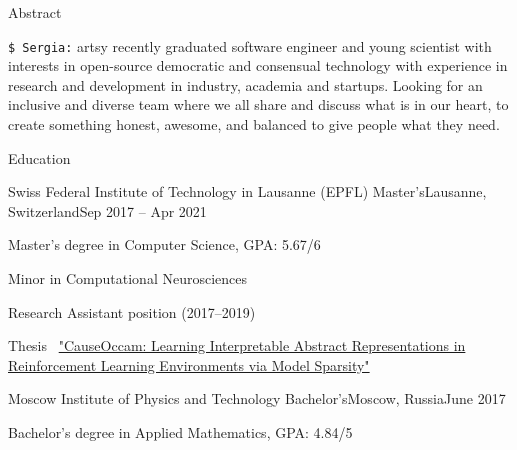 \documentclass{resume} %
\newcommand*{\img}[1]{%
	\raisebox{-.02\baselineskip}{%
		\texttt{[image: \#1]}%
	}%
}
\newcommand*{\emoji}[1]{\img{./emoji/\imgpref#1.png}}
\newcommand*{\mybold}[1]{{\color{pinkunderline} #1}}
\newcommand*{\logo}[1]{%
	\raisebox{-.02\baselineskip}{%
		\texttt{[image: ./img/\\imgpref\#1]}%
	}%
}
\def\imgpref{bleak-}
\newcommand{\mylink}{{\color{gray}\faExternalLink}}
\begin{document}
	 \renewcommand{\familydefault}{\sfdefault}
	 \sffamily
	
\newcommand{\myitem}{\item[\textcolor{pinkitem}{\Huge\raisebox{-2pt}{$\cdot$}}]}

\begin{rSection}{Abstract}

{{\color{pinkitem} \texttt{\$ Sergia:}} artsy recently graduated software engineer and young scientist with interests in open-source democratic and consensual technology with experience in research and development in industry, academia and startups. Looking for an inclusive and diverse team where we all share and discuss what is in our heart, to create something honest, awesome, and balanced to give people what they need.}

\end{rSection}

\begin{rSection}{Education}
\hspace{-1em}

\begin{rSubsection}{\logo{Logo_EPFL.pdf} Swiss Federal Institute of Technology in Lausanne (EPFL) \emoji{flag-ch}}{Master's}{Lausanne, Switzerland}{Sep 2017 -- Apr 2021}
\myitem Master's degree in \mybold{Computer Science,} GPA: \mybold{5.67}/6
\myitem Minor in Computational \mybold{Neurosciences}
\myitem Research Assistant position (2017--2019)
\myitem Thesis \mylink~\href{https://sergia-ch.github.io/causality-simplicity/CauseOccam_Learning_Interpretable_Abstract_Representations_in_Reinforcement_Learning_Environments_via_Model_Sparsity.pdf}{"CauseOccam: Learning Interpretable Abstract Representations in
Reinforcement Learning Environments via Model Sparsity"}
\end{rSubsection}
\begin{rSubsection}{\logo{mipt.png} Moscow Institute of Physics and Technology \emoji{flag-ru}}{Bachelor's}{Moscow, Russia}{June 2017}
\item[] Bachelor's degree in \mybold{Applied Mathematics,} GPA: \mybold{4.84}/5
\end{rSubsection}
\end{rSection}
\end{document}
